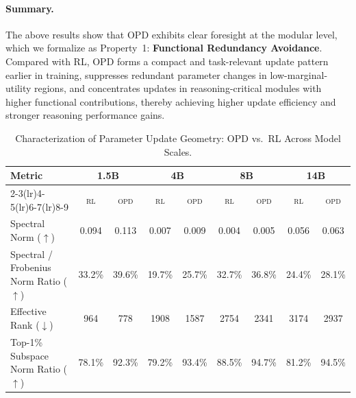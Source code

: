 \documentclass{llmxive}
\providecommand{\arraystretch}{0.95}
\begin{document}
\paragraph{Summary.}
The above results show that OPD exhibits clear foresight at the modular level, which we formalize as Property~1: \textbf{Functional Redundancy Avoidance}. Compared with RL, OPD forms a compact and task-relevant update pattern earlier in training, suppresses redundant parameter changes in low-marginal-utility regions, and concentrates updates in reasoning-critical modules with higher functional contributions, thereby achieving higher update efficiency and stronger reasoning performance gains.




\begin{table}[t]
\centering
\setlength{\tabcolsep}{2.5pt}
\renewcommand{\arraystretch}{0.95}
\begin{tabular}{l *{4}{cc}}
\toprule
\multirow{2}{*}{Metric}
& \multicolumn{2}{c}{\textbf{1.5B}}
& \multicolumn{2}{c}{\textbf{4B}}
& \multicolumn{2}{c}{\textbf{8B}}
& \multicolumn{2}{c}{\textbf{14B}} \\
\cmidrule(lr){2-3}\cmidrule(lr){4-5}\cmidrule(lr){6-7}\cmidrule(lr){8-9}
& \textsc{rl} & \textsc{opd}
& \textsc{rl} & \textsc{opd}
& \textsc{rl} & \textsc{opd}
& \textsc{rl} & \textsc{opd} \\
\midrule
Spectral Norm ($\uparrow$)
& 0.094 & 0.113
& 0.007 & 0.009
& 0.004 & 0.005
& 0.056 & 0.063 \\
Spectral / Frobenius Norm Ratio ($\uparrow$)
& 33.2\% & 39.6\%
& 19.7\% & 25.7\%
& 32.7\% & 36.8\%
& 24.4\% & 28.1\% \\
Effective Rank ($\downarrow$)
& 964  & 778
& 1908 & 1587
& 2754 & 2341
& 3174 & 2937 \\
Top-1\% Subspace Norm Ratio ($\uparrow$)
& 78.1\% & 92.3\%
& 79.2\% & 93.4\%
& 88.5\% & 94.7\%
& 81.2\% & 94.5\% \\
\bottomrule
\end{tabular}
\caption{Characterization of Parameter Update Geometry: OPD vs.\ RL Across Model Scales.}
\label{table1}
\end{table}
\end{document}
